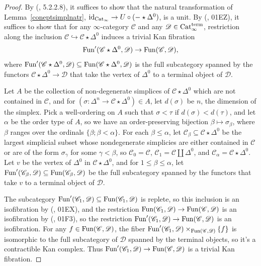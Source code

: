\documentclass{tac}
\newcommand{\s}[1]{\mathscr{#1}}
\newcommand{\maybehat}[1]{#1} %
\newcommand{\tx}[1]{\textnormal{#1}}
\begin{document}
\begin{proof} By (\cite{htt}, 5.2.2.8), it suffices to show that the natural transformation of Lemma~\ref{coneptsimplnatr}, $\tx{id}_{ \maybehat{\tx{Cat}}_\infty} \to U\circ (-\star \Delta^0)$, is a unit.  By (\cite{kerodon}, 01EZ), it suffices to show that for any $\infty$-category $\s{C}$ and any $\s{D} \in \maybehat{\tx{Cat}}_\infty^\tx{term}$, restriction along the inclusion $\s{C} \hookrightarrow \s{C}\star \Delta^0$ induces a trivial Kan fibration
\[ \tx{Fun}' (\s{C}\star \Delta^0 , \s{D}) \to \tx{Fun}(\s{C},\s{D}), \]
where $\tx{Fun}' (\s{C}\star \Delta^0 , \s{D}) \subseteq \tx{Fun} (\s{C}\star \Delta^0 , \s{D})$ is the full subcategory spanned by the functors $\s{C}\star \Delta^0 \to \s{D}$ that take the vertex of $\Delta^0$ to a terminal object of $\s{D}$. 

Let $A$ be the collection of non-degenerate simplices of $\s{C}\star \Delta^0$ which are not contained in $\s{C}$, and for $(\sigma : \Delta^n \to \s{C}\star\Delta^0 ) \in A$, let $d(\sigma)$ be $n$, the dimension of the simplex.  Pick a well-ordering on $A$ such that $\sigma <\tau$ if $d(\sigma) < d(\tau)$, and let $\alpha$ be the order type of $A$, so we have an order-preserving bijection $\beta \mapsto \sigma_\beta$, where $\beta$ ranges over the ordinals $\{\beta ; \beta <\alpha \}$.  For each $\beta\leq \alpha$, let $\s{C}_\beta \subseteq \s{C}\star \Delta^0$ be the largest simplicial subset whose nondegenerate simplicies are either contained in $\s{C}$ or are of the form $\sigma_{\gamma}$ for some $\gamma < \beta$, so $\s{C}_0 = \s{C}$, $\s{C}_1 = \s{C} \coprod \Delta^0$, and $\s{C}_\alpha = \s{C}\star \Delta^0$.  Let $v$ be the vertex of $\Delta^0$ in $\s{C}\star \Delta^0$, and for $1\leq \beta\leq \alpha$, let $\tx{Fun}' (\s{C}_\beta , \s{D}) \subseteq \tx{Fun}(\s{C}_\beta , \s{D})$ be the full subcategory spanned by the functors that take $v$ to a terminal object of $\s{D}$.

The subcategory $\tx{Fun}' (\s{C}_1 , \s{D}) \subseteq \tx{Fun} (\s{C}_1 , \s{D})$ is replete, so this inclusion is an isofibration by (\cite{kerodon}, 01EX), and the restriction $\tx{Fun} (\s{C}_1 , \s{D}) \to \tx{Fun}(\s{C},\s{D})$ is an isofibration by (\cite{kerodon}, 01F3), so the restriction $\tx{Fun}' (\s{C}_1 , \s{D}) \to \tx{Fun} (\s{C} , \s{D}) $ is an isofibration.  For any $f \in \tx{Fun} (\s{C} , \s{D})$, the fiber $\tx{Fun}' (\s{C}_1 , \s{D}) \times_{\tx{Fun}(\s{C},\s{D})} \{ f \}$ is isomorphic to the full subcategory of $\s{D}$ spanned by the terminal objects, so it's a contractible Kan complex.  Thus $\tx{Fun}' (\s{C}_1 , \s{D}) \to \tx{Fun} (\s{C} , \s{D}) $ is a trivial Kan fibration.


\end{proof}
\end{document}

